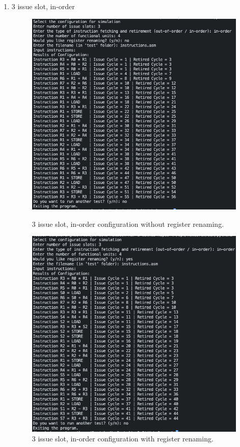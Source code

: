 \documentclass{article}
\begin{document}
\begin{enumerate}
    \item 3 issue slot, in-order
    \begin{figure}[H]
        \centering 
        \begin{minipage}[t]{0.45\textwidth}
            \centering
            \includegraphics[width=\textwidth]{Images/Config5.png}
            \caption{3 issue slot, in-order configuration without register renaming.}
        \end{minipage}
        \hfill
        \begin{minipage}[t]{0.45\textwidth}
            \centering 
            \includegraphics[width=\textwidth]{Images/Config5_Renaming.png}
            \caption{3 issue slot, in-order configuration with register renaming.}
        \end{minipage}
    \end{figure}


\end{enumerate}
\end{document}
